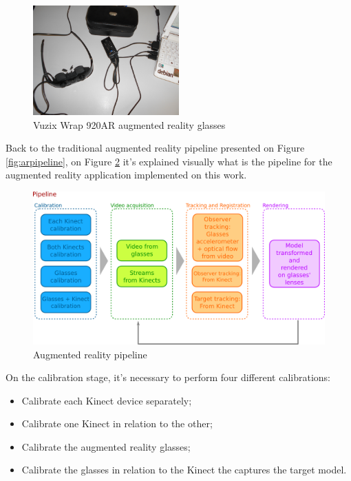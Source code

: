 \documentclass[msc, a4paper, classic, en]{ufbathesis}
\begin{document}
\begin{figure}
\centering
\includegraphics[width=0.5\textwidth]{images/vuzix.png}
\caption{Vuzix Wrap 920AR augmented reality glasses}
\label{fig:glasses}
\end{figure}

Back to the traditional augmented reality pipeline presented on Figure \ref{fig:arpipeline}, on Figure \ref{fig:pipeline} it's explained visually what is the pipeline for the augmented reality application implemented on this work.

\begin{figure}
\centering
\includegraphics[width=1\textwidth]{images/pipeline.png}
\caption{Augmented reality pipeline}
\label{fig:pipeline}
\end{figure}

On the calibration stage, it's necessary to perform four different calibrations:

\begin{itemize}
  \item Calibrate each Kinect device separately;
  \item Calibrate one Kinect in relation to the other;
  \item Calibrate the augmented reality glasses;
  \item Calibrate the glasses in relation to the Kinect the captures the target model.
\end{itemize}
\end{document}
